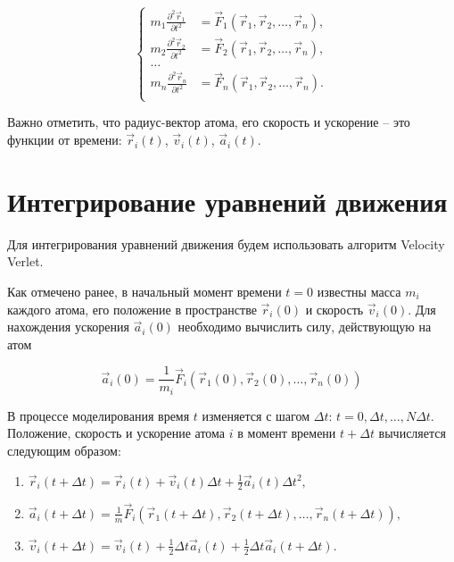 \documentclass[a4paper, 12pt]{article}
\begin{document}
$$
\left\{
   \begin{aligned}
    m_1 \frac{\partial^2 \vec{r}_1}{\partial t^2} &= \vec{F}_1(\vec{r}_1, \vec{r}_2, \ldots, \vec{r}_n),\\
    m_2 \frac{\partial^2 \vec{r}_2}{\partial t^2} &= \vec{F}_2(\vec{r}_1, \vec{r}_2, \ldots, \vec{r}_n),\\
    \ldots \\
    m_n \frac{\partial^2 \vec{r}_n}{\partial t^2} &= \vec{F}_n(\vec{r}_1, \vec{r}_2, \ldots, \vec{r}_n).\\
   \end{aligned}
  \right.
$$
               
Важно отметить, что радиус-вектор атома, его скорость и ускорение -- это функции от времени: $\vec{r}_i(t)$, $\vec{v}_i(t)$, $\vec{a}_i(t)$.

\section{Интегрирование уравнений движения}

Для интегрирования уравнений движения будем использовать алгоритм Velocity Verlet\cite{velverlet82}. 

Как отмечено ранее, в начальный момент времени $t = 0$ известны масса $m_i$ каждого атома, его положение в пространстве $\vec{r}_i(0)$ и скорость $\vec{v}_i(0)$. Для нахождения ускорения $\vec{a}_i(0)$ необходимо вычислить силу, действующую на атом

\begin{equation}
\vec{a}_i(0) = \frac{1}{m_i} \vec{F}_i(\vec{r}_1(0), \vec{r}_2(0), \ldots, \vec{r}_n(0))
\end{equation}

В процессе моделирования время $t$ изменяется с шагом $\Delta t$: $t = 0, \Delta t, \ldots, N\Delta t$. 
Положение, скорость и ускорение атома $i$ в момент времени $t + \Delta t$ вычисляется следующим образом:
\begin{enumerate}
\item $\vec{r}_i(t + \Delta t) = \vec{r}_i(t) +  \vec{v}_i(t) \Delta t + \frac{1}{2}  \vec{a}_i(t) \Delta t^2,$
\item $\vec{a}_i(t + \Delta t) = \frac{1}{m} \vec{F}_i(\vec{r}_1(t + \Delta t), \vec{r}_2(t + \Delta t), \ldots, \vec{r}_n(t + \Delta t)),$
\item $\vec{v}_i(t + \Delta t) = \vec{v}_i(t) +  \frac{1}{2}\Delta t\vec{a}_i(t) + \frac{1}{2}  \Delta t \vec{a}_i(t + \Delta t).$
\end{enumerate}
\end{document}
